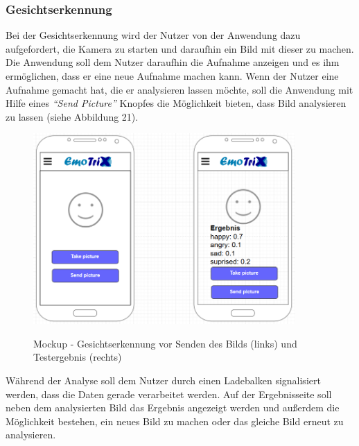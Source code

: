 \subsubsection{Gesichtserkennung}
\label{section:Mockup-Gesichtserkennung}
Bei der Gesichtserkennung wird der Nutzer von der Anwendung dazu aufgefordert, die Kamera zu starten und daraufhin ein Bild mit dieser zu machen. Die Anwendung soll dem Nutzer daraufhin die Aufnahme anzeigen und es ihm ermöglichen, dass er eine neue Aufnahme machen kann. Wenn der Nutzer eine Aufnahme gemacht hat, die er analysieren lassen möchte, soll die Anwendung mit Hilfe eines \textit{``Send Picture''} Knopfes die Möglichkeit bieten, dass Bild analysieren zu lassen (siehe Abbildung 21). \newline
\begin{figure}[h]
	\centering
	\includegraphics[width=10cm]{Bilder/Mockup-Gesichtserkennung.png}
	\label{img:Mockup-Gesichtserkennung}
	\caption[Mockup - Gesichtserkennung vor Senden des Bilds (links) und Testergebnis (rechts)]{Mockup - Gesichtserkennung vor Senden des Bilds (links) und Testergebnis (rechts)}
\end{figure} \newline
Während der Analyse soll dem Nutzer durch einen Ladebalken signalisiert werden, dass die Daten gerade verarbeitet werden. Auf der Ergebnisseite soll neben dem analysierten Bild das Ergebnis angezeigt werden und außerdem die Möglichkeit bestehen, ein neues Bild zu machen oder das gleiche Bild erneut zu analysieren.
